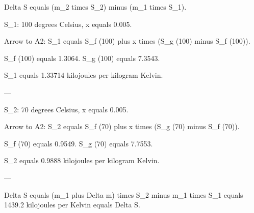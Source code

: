 Delta S equals (m_2 times S_2) minus (m_1 times S_1).  

S_1: 100 degrees Celsius, x equals 0.005.  

Arrow to A2: S_1 equals S_f (100) plus x times (S_g (100) minus S_f (100)).  

S_f (100) equals 1.3064.  
S_g (100) equals 7.3543.  

S_1 equals 1.33714 kilojoules per kilogram Kelvin.  

---

S_2: 70 degrees Celsius, x equals 0.005.  

Arrow to A2: S_2 equals S_f (70) plus x times (S_g (70) minus S_f (70)).  

S_f (70) equals 0.9549.  
S_g (70) equals 7.7553.  

S_2 equals 0.9888 kilojoules per kilogram Kelvin.  

---

Delta S equals (m_1 plus Delta m) times S_2 minus m_1 times S_1 equals 1439.2 kilojoules per Kelvin equals Delta S.